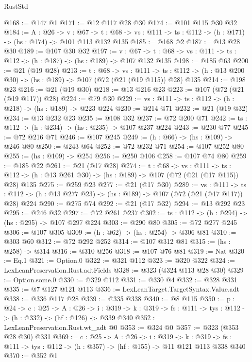 \begin{lexlean}{RustStd}
\begin{coremodule}
@168 := @147 @1
@171 := @12 @117 @28 @30
@174 := @101 @115 @30 @32
@184 := {A : @26} ->
  {v : @67} ->
  {t : @68} -> {vs : @111} -> {ts : @112} -> (h : @171) -> (hs : @174) -> @101 @113 @132 @135
@185 := @168 @2
@187 := @13 @28 @30
@189 := @107 @30 @32
@197 := {v : @67} ->
  {t : @68} -> {vs : @111} -> {ts : @112} -> (h : @187) -> (hs : @189) -> @107 @132 @135
@198 := @185 @63
@200 := @21 (@19 @28)
@213 := {t : @68} ->
  {vs : @111} ->
  {ts : @112} -> (h : @13 @200 @30) -> (hs : @189) -> @107 (@72 (@21 (@19 @115)) @28) @135
@214 := @198 @23
@216 := @21 (@19 @30)
@218 := @13 @216 @23
@223 := @107 (@72 (@21 (@19 @117)) @28)
@224 := @79 @30
@229 := {vs : @111} -> {ts : @112} -> (h : @218) -> (hs : @189) -> @223 @224
@230 := @214 @71
@232 := @21 (@19 @32)
@234 := @13 @232 @23
@235 := @108 @32
@237 := @72 @200 @71
@242 := {ts : @112} -> (h : @234) -> (hs : @235) -> @107 @237 @224
@243 := @230 @77
@245 := @72 @216 @71
@246 := @107 @245
@249 := (h : @66) -> (hs : @109) -> @246 @80
@250 := @243 @64
@252 := @72 @232 @71
@254 := @107 @252 @80
@255 := (hs : @109) -> @254
@256 := @250 @106
@258 := @107 @74 @80
@259 := @185 @22
@261 := @21 (@17 @28)
@274 := {t : @68} ->
  {vs : @111} ->
  {ts : @112} -> (h : @13 @261 @30) -> (hs : @189) -> @107 (@72 (@21 (@17 @115)) @28) @135
@275 := @259 @23
@277 := @21 (@17 @30)
@289 := {vs : @111} ->
  {ts : @112} -> (h : @13 @277 @23) -> (hs : @189) -> @107 (@72 (@21 (@17 @117)) @28) @224
@290 := @275 @74
@292 := @21 (@17 @32)
@294 := @13 @292 @23
@295 := @246 @32
@297 := @72 @261 @237
@302 := {ts : @112} -> (h : @294) -> (hs : @295) -> @107 @297 @224
@303 := @290 @80
@305 := @72 @277 @245
@306 := @107 @305
@309 := (h : @62) -> (hs : @254) -> @306 @81
@310 := @303 @60
@312 := @72 @292 @252
@314 := @107 @312 @81
@315 := (hs : @258) -> @314
@316 := @310 @256
@318 := @107 @76 @81
@319 := Nat
@320 := Eq.{1}
@321 := Option.{0}
@322 := @321 @112
@323 := @320 @322
@324 := LexLeanPreservation.Rust.adtFields
@328 := @323 (@324 @113 @28 @30)
@329 := Option.some.{0}
@330 := @329 @112
@331 := @330 @4
@332 := @328 @331
@335 := @7 @127 @121 @113
@336 := LexLeanTarget.TargetSyntax.Value.adt
@338 := @336 @117 @28
@339 := @335 @338
@340 := @8 @115
@350 := {p : @24} ->
  {c : @25} ->
  {A : @26} ->
  {i : @319} -> {k : @319} -> {fs : @111} -> {tys : @112} -> (h : @332) -> (hf : @126) -> @339 @340
@352 := LexLeanPreservation.Rust.wt_adt @0
@353 := @324 @0
@357 := @323 (@353 @28 @30) @331
@369 := {c : @25} ->
  {A : @26} ->
  {i : @319} ->
  {k : @319} -> {fs : @111} -> {tys : @112} -> (h : @357) -> (hf : @155) -> @11 @121 @113 @338 @340
@370 := @352 @1

\end{coremodule}
\end{lexlean}
